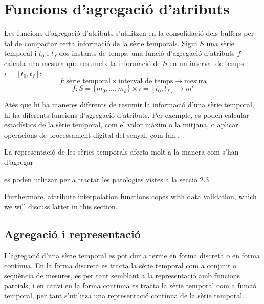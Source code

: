 \newcommand{\prev}{\ant}


\section{Funcions d'agregació d'atributs}
\label{sec:model:interpolador}
\label{sec:model:agregador}


Les funcions d'agregació d'atributs s'utilitzen en la consolidació
dels buffers per tal de compactar certa informació de la sèrie
temporals. Sigui $S$ una sèrie temporal i $t_0$ i $t_f$ dos instants
de temps, una funció d'agregació d'atributs $f$ calcula una mesura que
resumeix la informació de $S$ en un interval de temps $i=[t_0,t_f]$:
\[
f: \text{sèrie temporal} \times \text{interval de temps}
\longrightarrow \text{mesura}
\]
\[
f: S=\{m_0,\ldots,m_k\} \times i=[t_0,t_f] \longrightarrow  m'
\]


Atès que hi ha maneres diferents de resumir la informació d'una sèrie
temporal, hi ha diferents funcions d'agregació d'atributs. Per
exemple, es poden calcular estadístics de la sèrie temporal, com el
valor màxim o la mitjana, o aplicar operacions de processament digital
del senyal, com fan \textcite{zhang11}. 


La representació de les sèries temporals afecta molt a la manera com s'han d'agregar







es poden utlitzar per a tractar les patologies vistes a la secció 2.3

  Furthermore, attribute interpolation functions copes
with data validation, which we will discuss latter in this section.

\todo{}




\subsection{Agregació i representació}

L'agregació d'una sèrie temporal es pot dur a terme en forma discreta
o en forma contínua.  En la forma discreta es tracta la sèrie temporal
com a conjunt o seqüència de mesures, és per tant semblant a la
representació amb funcions parcials, i en canvi en la forma contínua
es tracta la sèrie temporal com a funció temporal, per tant s'utilitza
una representació contínua de la sèrie temporal.


